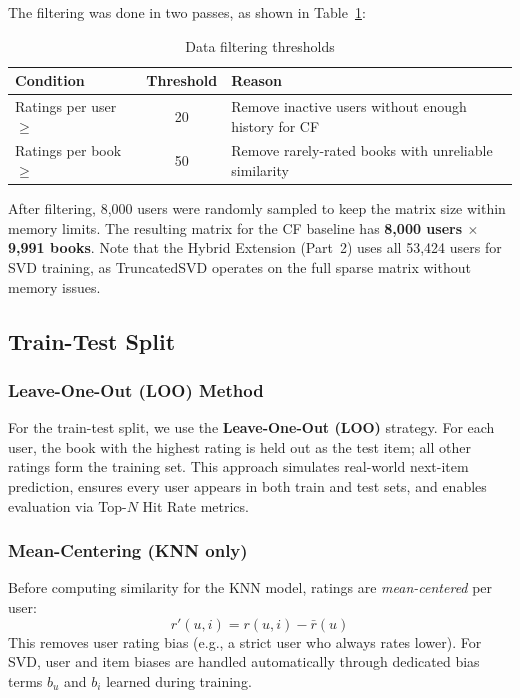 \documentclass[12pt, a4paper]{article}
\begin{document}
The filtering was done in two passes, as shown in Table~\ref{tab:filtering}:

\begin{table}[H]
  \centering
  \caption{Data filtering thresholds}
  \label{tab:filtering}
  \begin{tabular}{|l|c|p{7cm}|}
    \hline
    \textbf{Condition}       & \textbf{Threshold} & \textbf{Reason} \\
    \hline
    Ratings per user $\geq$  & 20 & Remove inactive users without enough history for CF \\
    \hline
    Ratings per book $\geq$  & 50 & Remove rarely-rated books with unreliable similarity \\
    \hline
  \end{tabular}
\end{table}

After filtering, 8,000 users were randomly sampled to keep the matrix size within memory limits.
The resulting matrix for the CF baseline has \textbf{8,000 users $\times$ 9,991 books}.
Note that the Hybrid Extension (Part~2) uses all 53,424 users for SVD training,
as TruncatedSVD operates on the full sparse matrix without memory issues.

\subsection{Train-Test Split}

\subsubsection*{Leave-One-Out (LOO) Method}

For the train-test split, we use the \textbf{Leave-One-Out (LOO)} strategy.
For each user, the book with the highest rating is held out as the test item;
all other ratings form the training set.
This approach simulates real-world next-item prediction, ensures every user appears
in both train and test sets, and enables evaluation via Top-$N$ Hit Rate metrics.

\subsubsection*{Mean-Centering (KNN only)}

Before computing similarity for the KNN model, ratings are \textit{mean-centered} per user:
\[
  r'(u, i) = r(u, i) - \bar{r}(u)
\]
This removes user rating bias (e.g., a strict user who always rates lower).
For SVD, user and item biases are handled automatically through dedicated bias terms
$b_u$ and $b_i$ learned during training.
\end{document}
